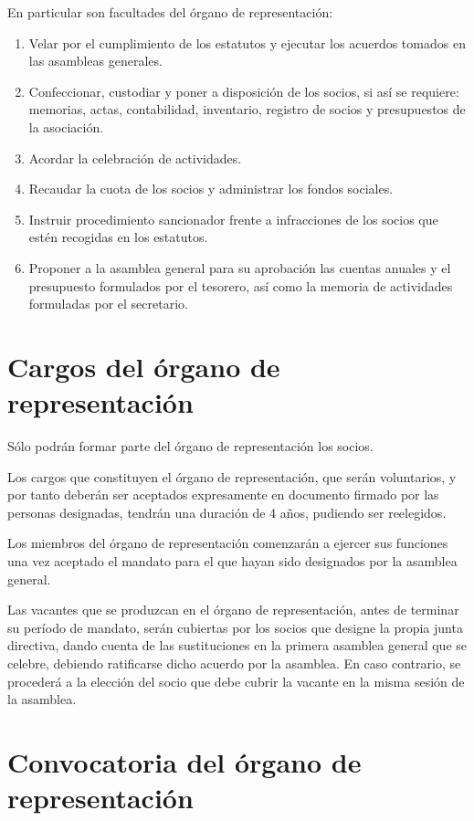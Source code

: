 \documentclass[a4paper, 12pt, oneside]{book}
\begin{document}
En particular son facultades del órgano de representación:

\begin{enumerate}
    \item Velar por el cumplimiento de los estatutos y ejecutar los acuerdos tomados en las asambleas generales.  
    \item Confeccionar, custodiar y poner a disposición de los socios, si así se requiere: memorias, actas, contabilidad, inventario, registro de socios y presupuestos de la asociación.  
    \item Acordar la celebración de actividades.  
    \item Recaudar la cuota de los socios y administrar los fondos sociales.  
    \item Instruir procedimiento sancionador frente a infracciones de los socios que estén recogidas en los estatutos.  
    \item Proponer a la asamblea general para su aprobación las cuentas anuales y el presupuesto formulados por el tesorero, así como la memoria de actividades formuladas por el secretario.
\end{enumerate}

\section{Cargos del órgano de representación}

Sólo podrán formar parte del órgano de representación los socios.

Los cargos que constituyen el órgano de representación, que serán voluntarios, y por tanto deberán ser aceptados expresamente en documento firmado por las personas designadas, tendrán una duración de 4 años, pudiendo ser reelegidos.

Los miembros del órgano de representación comenzarán a ejercer sus funciones una vez aceptado el mandato para el que hayan sido designados por la asamblea general.

Las vacantes que se produzcan en el órgano de representación, antes de terminar su período de mandato, serán cubiertas por los socios que designe la propia junta directiva, dando cuenta de las sustituciones en la primera asamblea general que se celebre, debiendo ratificarse dicho acuerdo por la asamblea. En caso contrario, se procederá a la elección del socio que debe cubrir la vacante en la misma sesión de la asamblea.

\section{Convocatoria del órgano de representación}
\end{document}
